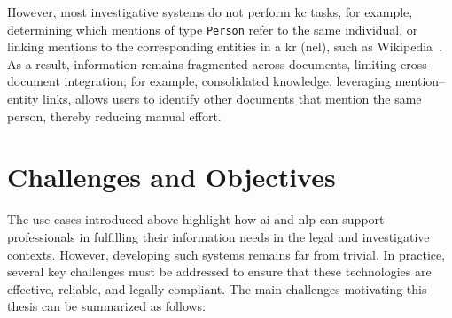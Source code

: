 However, most investigative systems do not perform \acl{kc} tasks, for example, determining which mentions of type \texttt{Person} refer to the same individual, or linking mentions to the corresponding entities in a \acl{kr} (\acl{nel}), such as Wikipedia~\cite{wikipedia}. As a result, information remains fragmented across documents, limiting cross-document integration; for example, consolidated knowledge, leveraging mention--entity links, allows users to identify other documents that mention the same person, thereby reducing manual effort.






\section{Challenges and Objectives}

The use cases introduced above highlight how \ac{ai} and \ac{nlp} can support professionals in fulfilling their information needs in the legal and investigative contexts.  
However, developing such systems remains far from trivial. In practice, several key challenges must be addressed to ensure that these technologies are effective, reliable, and legally compliant.  
The main challenges motivating this thesis can be summarized as follows:

